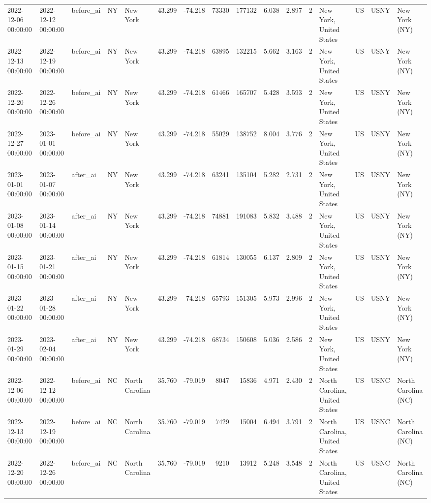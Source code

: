 \begin{tabular}{lllllrrrrrrlllll}
2022-12-06 00:00:00 & 2022-12-12 00:00:00 & before\_ai & NY & New York & 43.299 & -74.218 & 73330 & 177132 & 6.038 & 2.897 & 2 & New York, United States & US & USNY & New York (NY) \\
2022-12-13 00:00:00 & 2022-12-19 00:00:00 & before\_ai & NY & New York & 43.299 & -74.218 & 63895 & 132215 & 5.662 & 3.163 & 2 & New York, United States & US & USNY & New York (NY) \\
2022-12-20 00:00:00 & 2022-12-26 00:00:00 & before\_ai & NY & New York & 43.299 & -74.218 & 61466 & 165707 & 5.428 & 3.593 & 2 & New York, United States & US & USNY & New York (NY) \\
2022-12-27 00:00:00 & 2023-01-01 00:00:00 & before\_ai & NY & New York & 43.299 & -74.218 & 55029 & 138752 & 8.004 & 3.776 & 2 & New York, United States & US & USNY & New York (NY) \\
2023-01-01 00:00:00 & 2023-01-07 00:00:00 & after\_ai & NY & New York & 43.299 & -74.218 & 63241 & 135104 & 5.282 & 2.731 & 2 & New York, United States & US & USNY & New York (NY) \\
2023-01-08 00:00:00 & 2023-01-14 00:00:00 & after\_ai & NY & New York & 43.299 & -74.218 & 74881 & 191083 & 5.832 & 3.488 & 2 & New York, United States & US & USNY & New York (NY) \\
2023-01-15 00:00:00 & 2023-01-21 00:00:00 & after\_ai & NY & New York & 43.299 & -74.218 & 61814 & 130055 & 6.137 & 2.809 & 2 & New York, United States & US & USNY & New York (NY) \\
2023-01-22 00:00:00 & 2023-01-28 00:00:00 & after\_ai & NY & New York & 43.299 & -74.218 & 65793 & 151305 & 5.973 & 2.996 & 2 & New York, United States & US & USNY & New York (NY) \\
2023-01-29 00:00:00 & 2023-02-04 00:00:00 & after\_ai & NY & New York & 43.299 & -74.218 & 68734 & 150608 & 5.036 & 2.586 & 2 & New York, United States & US & USNY & New York (NY) \\
2022-12-06 00:00:00 & 2022-12-12 00:00:00 & before\_ai & NC & North Carolina & 35.760 & -79.019 & 8047 & 15836 & 4.971 & 2.430 & 2 & North Carolina, United States & US & USNC & North Carolina (NC) \\
2022-12-13 00:00:00 & 2022-12-19 00:00:00 & before\_ai & NC & North Carolina & 35.760 & -79.019 & 7429 & 15004 & 6.494 & 3.791 & 2 & North Carolina, United States & US & USNC & North Carolina (NC) \\
2022-12-20 00:00:00 & 2022-12-26 00:00:00 & before\_ai & NC & North Carolina & 35.760 & -79.019 & 9210 & 13912 & 5.248 & 3.548 & 2 & North Carolina, United States & US & USNC & North Carolina (NC) \\

\end{tabular}
